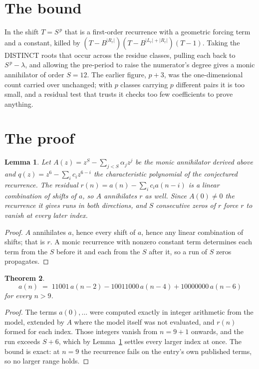 \documentclass[11pt,a4paper]{article}
\theoremstyle{plain}
\newtheorem{theorem}{Theorem}
\newtheorem{lemma}[theorem]{Lemma}
\theoremstyle{definition}
\begin{document}
\section{The bound}

In the shift $T=S^{\,p}$ that is a first-order recurrence with a geometric forcing term and a
constant, killed by $(T-B^{|R_r|})(T-B^{|L_r|+|R_r|})(T-1)$. Taking the DISTINCT roots that
occur across the residue classes, pulling each back to $S^{\,p}-\lambda$, and allowing the
pre-period to raise the numerator's degree gives a monic annihilator of order $S=12$. The
earlier figure, $p+3$, was the one-dimensional count carried over unchanged; with $p$ classes
carrying $p$ different pairs it is too small, and a residual test that trusts it checks too few
coefficients to prove anything.

\section{The proof}

\begin{lemma}\label{lem:crit}
Let $A(z)=z^S-\sum_{j<S}\alpha_jz^{j}$ be the monic annihilator derived above and
$q(z)=z^{6}-\sum_ic_iz^{6-i}$ the characteristic polynomial of the conjectured
recurrence. The residual $r(n)=a(n)-\sum_ic_ia(n-i)$ is a linear combination of shifts of $a$,
so $A$ annihilates $r$ as well. Since $A(0)\ne0$ the recurrence it gives runs in both
directions, and $S$ consecutive zeros of $r$ force $r$ to vanish at every later index.
\end{lemma}

\begin{proof}
$A$ annihilates $a$, hence every shift of $a$, hence any linear combination of shifts; that is
$r$. A monic recurrence with nonzero constant term determines each term from the $S$ before it
and each from the $S$ after it, so a run of $S$ zeros propagates.
\end{proof}

\begin{theorem}
\[
a(n)\;=\;11001\,a(n-2) - 10011000\,a(n-4) + 10000000\,a(n-6)
\]
for every $n>9$.
\end{theorem}

\begin{proof}
The terms $a(0),\dots$ were computed exactly in integer arithmetic from the model, extended by
$A$ where the model itself was not evaluated, and $r(n)$ formed for each index. Those integers
vanish from $n=9+1$ onwards, and the run exceeds $S+6$, which by
Lemma~\ref{lem:crit} settles every larger index at once. The bound is exact: at $n=9$ the recurrence fails on the entry's own published terms, so no larger range holds.
\end{proof}
\end{document}
